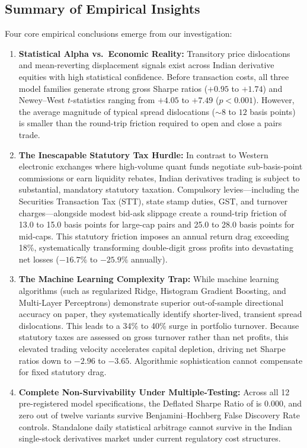 \documentclass[11pt,a4paper]{article}
\begin{document}
\subsection{Summary of Empirical Insights}
Four core empirical conclusions emerge from our investigation:
\begin{enumerate}
    \item \textbf{Statistical Alpha vs.\ Economic Reality:} Transitory price dislocations and mean-reverting displacement signals exist across Indian derivative equities with high statistical confidence. Before transaction costs, all three model families generate strong gross Sharpe ratios ($+0.95$ to $+1.74$) and Newey--West $t$-statistics ranging from $+4.05$ to $+7.49$ ($p < 0.001$). However, the average magnitude of typical spread dislocations ($\sim 8$ to $12$ basis points) is smaller than the round-trip friction required to open and close a pairs trade.
    \item \textbf{The Inescapable Statutory Tax Hurdle:} In contrast to Western electronic exchanges where high-volume quant funds negotiate sub-basis-point commissions or earn liquidity rebates, Indian derivatives trading is subject to substantial, mandatory statutory taxation. Compulsory levies---including the Securities Transaction Tax (STT), state stamp duties, GST, and turnover charges---alongside modest bid-ask slippage create a round-trip friction of 13.0 to 15.0 basis points for large-cap pairs and 25.0 to 28.0 basis points for mid-caps. This statutory friction imposes an annual return drag exceeding 18\%, systematically transforming double-digit gross profits into devastating net losses ($-16.7\%$ to $-25.9\%$ annually).
    \item \textbf{The Machine Learning Complexity Trap:} While machine learning algorithms (such as regularized Ridge, Histogram Gradient Boosting, and Multi-Layer Perceptrons) demonstrate superior out-of-sample directional accuracy on paper, they systematically identify shorter-lived, transient spread dislocations. This leads to a 34\% to 40\% surge in portfolio turnover. Because statutory taxes are assessed on gross turnover rather than net profits, this elevated trading velocity accelerates capital depletion, driving net Sharpe ratios down to $-2.96$ to $-3.65$. Algorithmic sophistication cannot compensate for fixed statutory drag.
    \item \textbf{Complete Non-Survivability Under Multiple-Testing:} Across all 12 pre-registered model specifications, the Deflated Sharpe Ratio of \citet{bailey2014deflated} is $0.000$, and zero out of twelve variants survive Benjamini--Hochberg False Discovery Rate controls. Standalone daily statistical arbitrage cannot survive in the Indian single-stock derivatives market under current regulatory cost structures.
\end{enumerate}
\end{document}
